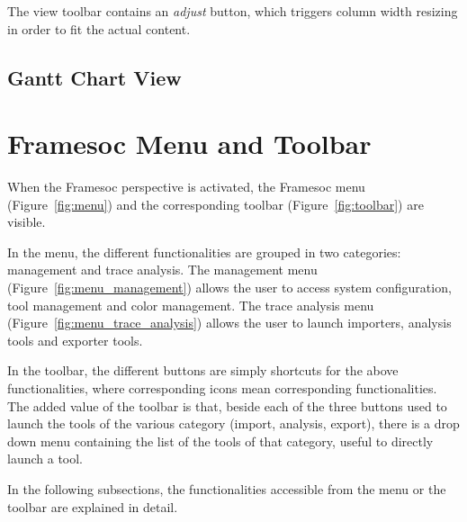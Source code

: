 \documentclass[twoside]{article}
\begin{document}
\begin{sloppypar}
The view toolbar contains an \emph{adjust} button, which triggers column width resizing in order to fit the actual content.

\subsection{Gantt Chart View}
\label{subsec:gantt}


\section{Framesoc Menu and Toolbar}
\label{sec:menu}

When the Framesoc perspective is activated, the Framesoc menu (Figure~\ref{fig:menu}) and the corresponding toolbar (Figure~\ref{fig:toolbar}) are visible. 

In the menu, the different functionalities are grouped in two categories: management and trace analysis.
The management menu (Figure~\ref{fig:menu_management}) allows the user to access system configuration, tool management and color management.
The trace analysis menu (Figure~\ref{fig:menu_trace_analysis}) allows the user to launch importers, analysis tools and exporter tools.

In the toolbar, the different buttons are simply shortcuts for the above functionalities, where corresponding icons mean corresponding functionalities.
The added value of the toolbar is that, beside each of the three buttons used to launch the tools of the various category (import, analysis, export), there is a drop down menu containing the list of the tools of that category, useful to directly launch a tool.

In the following subsections, the functionalities accessible from the menu or the toolbar are explained in detail.


\end{sloppypar}
\end{document}

